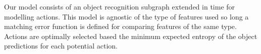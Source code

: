 \documentclass[conference]{IEEEtran}
\begin{document}



    Our model consists of an object recognition subgraph extended in time for modelling actions. 
    This model is agnostic of the type of features used so long a matching error function is defined for comparing features of the same type. Actions are optimally selected based the minimum expected entropy of the object predictions for each potential action.


        
\end{document}
